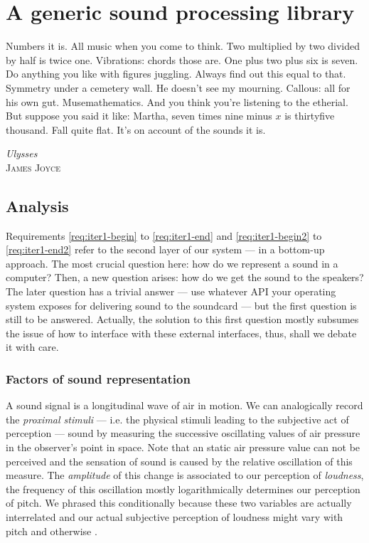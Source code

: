 
\chapter{A generic sound processing library}
\label{sec:03-meta}

{
  \setlength{\epigraphwidth}{.65\textwidth}
  \epigraph{Numbers it is. All music when you come to think.  Two
    multiplied by two divided by half is twice one.  Vibrations: chords
    those are. One plus two plus six is seven. Do anything you like with
    figures juggling. Always find out this equal to that. Symmetry under
    a cemetery wall. He doesn’t see my mourning. Callous: all for his
    own gut. Musemathematics. And you think you’re listening to the
    etherial. But suppose you said it like: Martha, seven times nine
    minus $x$ is thirtyfive thousand.  Fall quite flat. It’s on account of
    the sounds it is.}{\emph{Ulysses}\\\textsc{James Joyce}}
}

\section{Analysis}

Requirements \ref{req:iter1-begin} to \ref{req:iter1-end} and
\ref{req:iter1-begin2} to \ref{req:iter1-end2} refer to the second
layer of our system --- in a bottom-up approach. The most crucial
question here: how do we represent a sound in a computer? Then, a new
question arises: how do we get the sound to the speakers? The later
question has a trivial answer --- use whatever API your operating
system exposes for delivering sound to the soundcard --- but the first
question is still to be answered. Actually, the solution to this first
question mostly subsumes the issue of how to interface with these
external interfaces, thus, shall we debate it with care.

\subsection{Factors of sound representation}

A sound signal is a longitudinal wave of air in motion. We can
analogically record the \emph{proximal stimuli} --- i.e. the physical
stimuli leading to the subjective act of perception
\cite{goldstein01sensation} --- sound by measuring the successive
oscillating values of air pressure in the observer's point in
space. Note that an static air pressure value can not be perceived and
the sensation of sound is caused by the relative oscillation of this
measure. The \emph{amplitude} of this change is associated to our
perception of \emph{loudness}, the frequency of this oscillation
mostly logarithmically determines our perception of pitch. We phrased
this conditionally because these two variables are actually
interrelated and our actual subjective perception of loudness might
vary with pitch and otherwise \cite{fletcher37loudness}.

